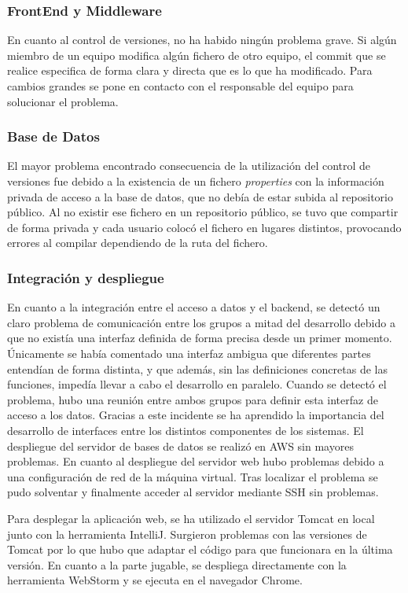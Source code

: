 \subsubsection*{FrontEnd y Middleware}
En cuanto al control de versiones, no ha habido ningún problema grave. Si algún miembro de un equipo modifica algún fichero de otro equipo, el commit que se realice especifica de forma clara y directa que es lo que ha modificado. Para cambios grandes se pone en contacto con el responsable del equipo para solucionar el problema.
\subsubsection*{Base de Datos}
El mayor problema encontrado consecuencia de la utilización del control de versiones fue debido a la existencia de un fichero \textit{properties} con la información privada de acceso a la base de datos, que no debía de estar subida al repositorio público. Al no existir ese fichero en un repositorio público, se tuvo que compartir de forma privada y cada usuario colocó el fichero en lugares distintos, provocando errores al compilar dependiendo de la ruta del fichero.
\subsubsection*{Integración y despliegue}
En cuanto a la integración entre el acceso a datos y el backend, se detectó un claro problema de comunicación entre los grupos a mitad del desarrollo debido a que no existía una interfaz definida de forma precisa desde un primer momento. Únicamente se había comentado una interfaz ambigua que diferentes partes entendían de forma distinta, y que además, sin las definiciones concretas de las funciones, impedía llevar a cabo el desarrollo en paralelo. Cuando se detectó el problema, hubo una reunión entre ambos grupos para definir esta interfaz de acceso a los datos. Gracias a este incidente se ha aprendido la importancia del desarrollo de interfaces entre los distintos componentes de los sistemas.
El despliegue del servidor de bases de datos se realizó en AWS sin mayores problemas. En cuanto al despliegue del servidor web hubo problemas debido a una configuración de red de la máquina virtual. Tras localizar el problema se pudo solventar y finalmente acceder al servidor mediante SSH sin problemas.

Para desplegar la aplicación web, se ha utilizado el servidor Tomcat en local junto con la herramienta IntelliJ. Surgieron problemas con las versiones de Tomcat por lo que hubo que adaptar el código para que funcionara en la última versión. En cuanto a la parte jugable, se despliega directamente con la herramienta WebStorm y se ejecuta en el navegador Chrome.

